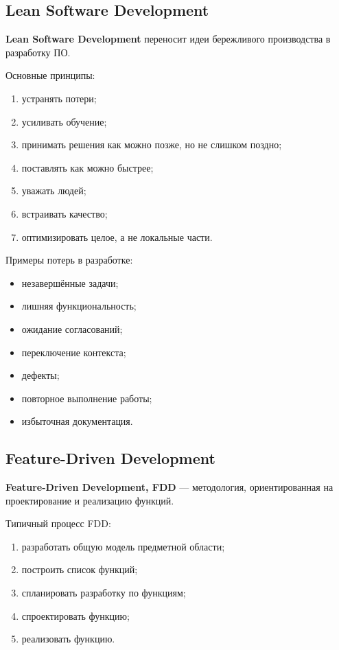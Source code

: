 \documentclass[12pt,a4paper]{article}
\begin{document}
\subsection{Lean Software Development}

\textbf{Lean Software Development} переносит идеи бережливого производства в разработку ПО.

Основные принципы:
\begin{enumerate}
    \item устранять потери;
    \item усиливать обучение;
    \item принимать решения как можно позже, но не слишком поздно;
    \item поставлять как можно быстрее;
    \item уважать людей;
    \item встраивать качество;
    \item оптимизировать целое, а не локальные части.
\end{enumerate}

Примеры потерь в разработке:
\begin{itemize}
    \item незавершённые задачи;
    \item лишняя функциональность;
    \item ожидание согласований;
    \item переключение контекста;
    \item дефекты;
    \item повторное выполнение работы;
    \item избыточная документация.
\end{itemize}

\subsection{Feature-Driven Development}

\textbf{Feature-Driven Development, FDD} --- методология, ориентированная на проектирование и реализацию функций.

Типичный процесс FDD:
\begin{enumerate}
    \item разработать общую модель предметной области;
    \item построить список функций;
    \item спланировать разработку по функциям;
    \item спроектировать функцию;
    \item реализовать функцию.
\end{enumerate}
\end{document}

